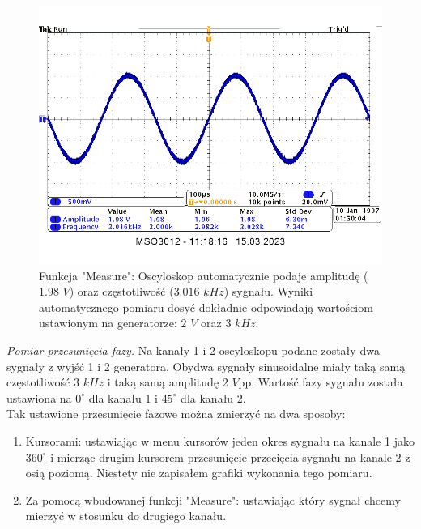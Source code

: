 \documentclass[14pt, table]{extarticle}
\begin{document}
\begin{figure}[H]
\includegraphics[scale=0.65]{A15}
\centering
\captionsetup{labelformat=empty}
\caption{Funkcja "Measure": Oscyloskop automatycznie podaje amplitudę ($1.98$ $V$) oraz częstotliwość ($3.016$ $kHz$) sygnału. Wyniki automatycznego pomiaru dosyć dokładnie odpowiadają wartościom ustawionym na generatorze: $2$ $V$ oraz $3$ $kHz$.}
\end{figure}

\newpage
\textit{Pomiar przesunięcia fazy.} Na kanały 1 i 2 oscyloskopu podane zostały dwa sygnały z wyjść 1 i 2 generatora. Obydwa sygnały sinusoidalne miały taką samą częstotliwość $3$ $kHz$ i taką samą amplitudę $2$ $V$pp. Wartość fazy sygnału została ustawiona na $0^{\circ}$ dla kanału 1 i $45^{\circ}$ dla kanału 2. \\

Tak ustawione przesunięcie fazowe można zmierzyć na dwa sposoby:
\begin{enumerate}
    \item Kursorami: ustawiając w menu kursorów jeden okres sygnału na kanale 1 jako $360^{\circ}$ i mierząc drugim kursorem przesunięcie przecięcia sygnału na kanale 2 z osią poziomą. Niestety nie zapisałem grafiki wykonania tego pomiaru.
    \item Za pomocą wbudowanej funkcji "Measure": ustawiając który sygnał chcemy mierzyć w stosunku do drugiego kanału.
\end{enumerate}
\end{document}
